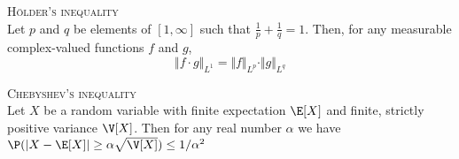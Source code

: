 \begin{lm}{\textsc{Hölder's inequality} \\}\label{A.3.3}
Let $p$ and $q$ be elements of $[1, \infty]$ such that $\frac{1}{p} + \frac{1}{q} = 1$. Then, for any measurable complex-valued functions $f$ and $g$,
\[\Vert f \cdot g \Vert_{L^{1}} = \Vert f \Vert_{L^{p}} \cdot \Vert g \Vert_{L^{q}}\]
\end{lm}

\begin{lm}{\textsc{Chebyshev's inequality} \\}\label{A.3.4}
Let $X$ be a random variable with finite expectation $\E[ X ]$ and finite, strictly positive variance $\V[X]$. Then for any real number $\alpha$ we have $\P(\vert X - \E[X] \vert \geq \alpha \sqrt{\V[X]}) \leq 1/ \alpha^{2}$
\end{lm}